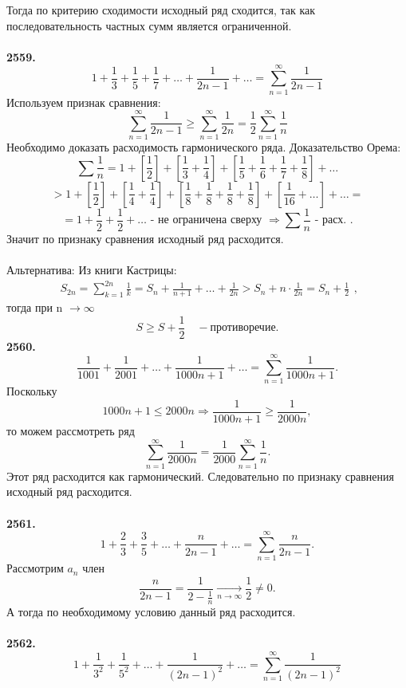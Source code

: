 \documentclass[a4paper, 12pt]{report}
\numberwithin{equation}{section}
\begin{document}
	Тогда по критерию сходимости исходный ряд сходится, так как последовательность частных сумм является ограниченной.
	\\\\
	\textbf{2559.}
	$$ 1 + \frac{1}{3} + \frac{1}{5} + \frac{1}{7} + \dots + \frac{1}{2n-1} + \dots = \sum_{n=1}^{\infty} \frac{1}{2n-1} $$
	Используем признак сравнения:
	$$ \sum_{n=1}^{\infty} \frac{1}{2n-1} \ge \sum_{n=1}^{\infty} \frac{1}{2n} = \frac{1}{2} \sum_{n=1}^{\infty} \frac{1}{n} $$
	Необходимо доказать расходимость гармонического ряда.
	Доказательство Орема:
	$$ \sum \frac{1}{n} = 1 + \left[\frac{1}{2}\right] + \left[\frac{1}{3} + \frac{1}{4}\right] + \left[\frac{1}{5} + \frac{1}{6} + \frac{1}{7} + \frac{1}{8}\right] + \dots $$
	$$ > 1 + \left[\frac{1}{2}\right] + \left[\frac{1}{4} + \frac{1}{4}\right] + \left[\frac{1}{8} + \frac{1}{8} + \frac{1}{8} + \frac{1}{8}\right] + \left[\frac{1}{16} + \dots\right] + \dots = $$
	$$ = 1 + \frac{1}{2} + \frac{1}{2} + \dots \text{ - не ограничена сверху } \Rightarrow \sum \frac{1}{n} \text{ - расх. }.$$
	Значит по признаку сравнения исходный ряд расходится.
	\\\\
	Альтернатива: Из книги Кастрицы:
	$$ \begin{gathered} S_{2n} = \sum_{k=1}^{2n} \frac{1}{k} = S_n + \frac{1}{n+1} + \dots + \frac{1}{2n} > S_n + n \cdot \frac{1}{2n} = S_n + \frac{1}{2} \end{gathered} ,$$
	тогда при n $\to \infty$
	$$ S \ge S + \frac{1}{2} \quad - \text{противоречие}.$$
	\textbf{2560.}
	$$ \frac{1}{1001} + \frac{1}{2001} + \dots + \frac{1}{1000n+1} + \dots = \sum_{n=1}^{\infty} \frac{1}{1000n+1}.$$
	Поскольку
	$$ 1000n+1 \le 2000n \Rightarrow \frac{1}{1000n+1} \ge \frac{1}{2000n},$$
	то можем рассмотреть ряд
	$$ \sum_{n=1}^{\infty} \frac{1}{2000n} = \frac{1}{2000} \sum_{n=1}^{\infty} \frac{1}{n}.$$ Этот ряд расходится как гармонический. Следовательно по признаку сравнения исходный ряд расходится.
	\\\\
	\textbf{2561.}
	$$ 1 + \frac{2}{3} + \frac{3}{5} + \dots + \frac{n}{2n-1} + \dots = \sum_{n=1}^{\infty} \frac{n}{2n-1}.$$
	Рассмотрим $a_n$ член
	$$ \frac{n}{2n-1} = \frac{1}{2-\frac{1}{n}} \xrightarrow[n \to \infty]{} \frac{1}{2} \ne 0.$$ А тогда по необходимому условию данный ряд расходится.
	\\\\
	\textbf{2562.}
	$$ 1 + \frac{1}{3^2} +\dfrac{1}{5^2} + \dots + \frac{1}{(2n-1)^2} + \dots = \sum_{n=1}^{\infty} \frac{1}{(2n-1)^2} $$
\end{document}
